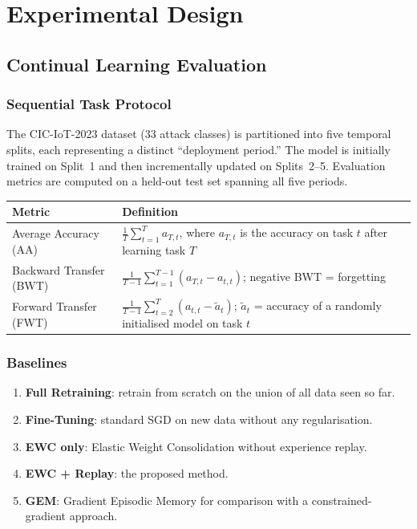 \documentclass[12pt,a4paper]{article}
\theoremstyle{definition}
\begin{document}
\section{Experimental Design}
\label{sec:experiments}

\subsection{Continual Learning Evaluation}

\subsubsection{Sequential Task Protocol}

The CIC-IoT-2023 dataset (33 attack classes) is partitioned into five temporal splits, each representing a distinct ``deployment period.''
The model is initially trained on Split~1 and then incrementally updated on Splits~2--5.
Evaluation metrics are computed on a held-out test set spanning all five periods.

\begin{center}
\begin{tabular}{ll}
\toprule
Metric & Definition \\
\midrule
Average Accuracy (AA) & $\frac{1}{T}\sum_{t=1}^{T} a_{T,t}$, where $a_{T,t}$ is the accuracy on task $t$ after learning task $T$ \\
Backward Transfer (BWT) & $\frac{1}{T-1}\sum_{t=1}^{T-1}(a_{T,t} - a_{t,t})$; negative BWT = forgetting \\
Forward Transfer (FWT) & $\frac{1}{T-1}\sum_{t=2}^{T}(a_{t,t} - \tilde{a}_t)$; $\tilde{a}_t$ = accuracy of a randomly initialised model on task $t$ \\
\bottomrule
\end{tabular}
\end{center}

\subsubsection{Baselines}

\begin{enumerate}
\item \textbf{Full Retraining}: retrain from scratch on the union of all data seen so far.
\item \textbf{Fine-Tuning}: standard SGD on new data without any regularisation.
\item \textbf{EWC only}: Elastic Weight Consolidation without experience replay.
\item \textbf{EWC + Replay}: the proposed method.
\item \textbf{GEM}: Gradient Episodic Memory for comparison with a constrained-gradient approach.
\end{enumerate}
\end{document}
